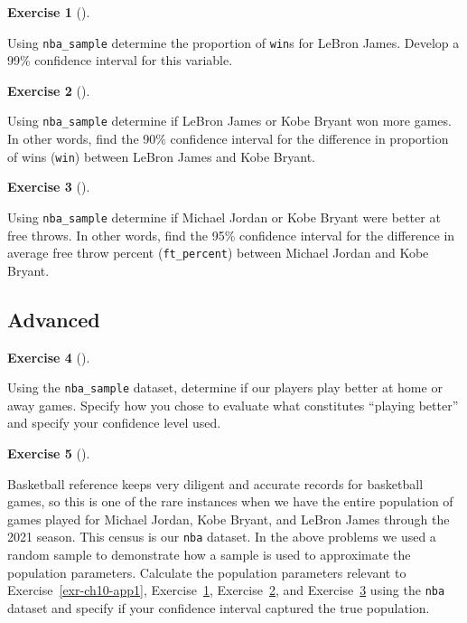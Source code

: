 \documentclass[
  letterpaper,
  DIV=11,
  numbers=noendperiod]{scrreprt}
\theoremstyle{definition}
\newtheorem{exercise}{Exercise}[chapter]
\theoremstyle{remark}
\begin{document}
\begin{exercise}[]\protect\hypertarget{exr-ch10-app2}{}\label{exr-ch10-app2}

Using \texttt{nba\_sample} determine the proportion of \texttt{win}s for
LeBron James. Develop a 99\% confidence interval for this variable.

\end{exercise}

\begin{exercise}[]\protect\hypertarget{exr-ch10-app3}{}\label{exr-ch10-app3}

Using \texttt{nba\_sample} determine if LeBron James or Kobe Bryant won
more games. In other words, find the 90\% confidence interval for the
difference in proportion of wins (\texttt{win}) between LeBron James and
Kobe Bryant.

\end{exercise}

\begin{exercise}[]\protect\hypertarget{exr-ch10-app4}{}\label{exr-ch10-app4}

Using \texttt{nba\_sample} determine if Michael Jordan or Kobe Bryant
were better at free throws. In other words, find the 95\% confidence
interval for the difference in average free throw percent
(\texttt{ft\_percent}) between Michael Jordan and Kobe Bryant.

\end{exercise}

\hypertarget{sec-ex10-advanced}{%
\subsection{Advanced}\label{sec-ex10-advanced}}

\begin{exercise}[]\protect\hypertarget{exr-ch10-adv1}{}\label{exr-ch10-adv1}

Using the \texttt{nba\_sample} dataset, determine if our players play
better at home or away games. Specify how you chose to evaluate what
constitutes ``playing better'' and specify your confidence level used.

\end{exercise}

\begin{exercise}[]\protect\hypertarget{exr-ch10-adv2}{}\label{exr-ch10-adv2}

Basketball reference keeps very diligent and accurate records for
basketball games, so this is one of the rare instances when we have the
entire population of games played for Michael Jordan, Kobe Bryant, and
LeBron James through the 2021 season. This census is our \texttt{nba}
dataset. In the above problems we used a random sample to demonstrate
how a sample is used to approximate the population parameters. Calculate
the population parameters relevant to Exercise~\ref{exr-ch10-app1},
Exercise~\ref{exr-ch10-app2}, Exercise~\ref{exr-ch10-app3}, and
Exercise~\ref{exr-ch10-app4} using the \texttt{nba} dataset and specify
if your confidence interval captured the true population.

\end{exercise}
\end{document}
